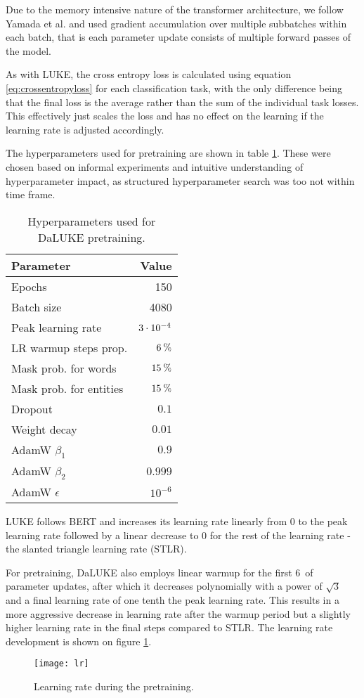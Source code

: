\documentclass[main.tex]{subfiles}
\begin{document}
Due to the memory intensive nature of the transformer architecture, we follow Yamada et al. and used gradient accumulation over multiple subbatches within each batch, that is each parameter update consists of multiple forward passes of the model.

As with LUKE, the cross entropy loss is calculated using equation \ref{eq:crossentropyloss} for each classification task, with the only difference being that the final loss is the average rather than the sum of the individual task losses.
This effectively just scales the loss and has no effect on the learning if the learning rate is adjusted accordingly.

The hyperparameters used for pretraining are shown in table \ref{tab:pretrain-hyper}.
These were chosen based on informal experiments and intuitive understanding of hyperparameter impact, as structured hyperparameter search was too not within time frame.
\begin{table}[H]
    \centering
    \begin{tabular}{l|r}
        Parameter  &    Value\\\hline
        Epochs     & 150\\
        Batch size &    4080\\
        Peak learning rate & $3\cdot10^{-4}$\\
        LR warmup steps prop. & $ 6\:\text{\%{}} $\\
        Mask prob. for words & $ 15\:\text{\%{}} $\\
        Mask prob. for entities & $ 15\:\text{\%{}} $\\
        Dropout & $ 0.1 $\\
        Weight decay & $ 0.01 $\\
        AdamW $ \beta_1 $ & $ 0.9 $\\
        AdamW $ \beta_2 $ & $ 0.999 $\\
        AdamW $ \epsilon $ & $ 10^{-6} $
    \end{tabular}
    \caption{Hyperparameters used for DaLUKE pretraining.}\label{tab:pretrain-hyper}
\end{table}\noindent
LUKE follows BERT and increases its learning rate linearly from 0 to the peak learning rate followed by a linear decrease to 0 for the rest of the learning rate - the slanted triangle learning rate (STLR). \cite{devlin2019bert, yamada2020luke, howardruder2018universal}

For pretraining, DaLUKE also employs linear warmup for the first 6\pro\ of parameter updates, after which it decreases polynomially with a power of $ \sqrt{3} $ and a final learning rate of one tenth the peak learning rate.
This results in a more aggressive decrease in learning rate after the warmup period but a slightly higher learning rate in the final steps compared to STLR.
The learning rate development is shown on figure \ref{fig:lr}.
\begin{figure}[H]
    \centering
    \texttt{[image: lr]}
    \caption{Learning rate during the pretraining.}
    \label{fig:lr}
\end{figure}\noindent
\end{document}
